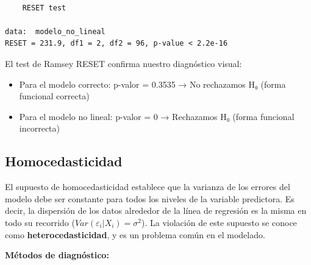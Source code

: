 \documentclass[
  letterpaper,
  DIV=11,
  numbers=noendperiod]{scrreprt}
\providecommand{\tightlist}{%
  \setlength{\itemsep}{0pt}\setlength{\parskip}{0pt}}
\begin{document}
\begin{tcolorbox}
\begin{verbatim}

    RESET test

data:  modelo_no_lineal
RESET = 231.9, df1 = 2, df2 = 96, p-value < 2.2e-16
\end{verbatim}

El test de Ramsey RESET confirma nuestro diagnóstico visual:

\begin{itemize}
\tightlist
\item
  Para el modelo correcto: p-valor = 0.3535 → No rechazamos H₀ (forma
  funcional correcta)
\item
  Para el modelo no lineal: p-valor = 0 → Rechazamos H₀ (forma funcional
  incorrecta)
\end{itemize}

\end{tcolorbox}

\subsection{Homocedasticidad}\label{homocedasticidad}

El supuesto de homocedasticidad establece que la varianza de los errores
del modelo debe ser constante para todos los niveles de la variable
predictora. Es decir, la dispersión de los datos alrededor de la línea
de regresión es la misma en todo su recorrido
(\(Var(\varepsilon_i | X_i) = \sigma^2\)). La violación de este supuesto
se conoce como \textbf{heterocedasticidad}, y es un problema común en el
modelado.

\textbf{Métodos de diagnóstico:}
\end{document}

